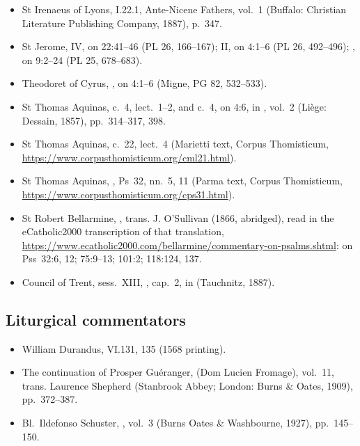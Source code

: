 {\begin{itemize}
\item St Irenaeus of Lyons,  I.22.1, Ante-Nicene Fathers, vol.~1 (Buffalo: Christian Literature Publishing Company, 1887), p.~347.
\item St Jerome,  IV, on 22:41--46 (PL 26, 166--167);  II, on 4:1--6 (PL 26, 492--496); , on 9:2--24 (PL 25, 678--683).
\item Theodoret of Cyrus, , on 4:1--6 (Migne, PG 82, 532--533).
\item St Thomas Aquinas,  c.~4, lect.~1--2, and  c.~4, on 4:6, in , vol.~2 (Liège: Dessain, 1857), pp.~314--317, 398.
\item St Thomas Aquinas,  c.~22, lect.~4 (Marietti text, Corpus Thomisticum, \url{https://www.corpusthomisticum.org/cml21.html}).
\item St Thomas Aquinas, , Ps~32, nn.~5, 11 (Parma text, Corpus Thomisticum, \url{https://www.corpusthomisticum.org/cps31.html}).
\item St Robert Bellarmine, , trans. J. O'Sullivan (1866, abridged), read in the eCatholic2000 transcription of that translation, \url{https://www.ecatholic2000.com/bellarmine/commentary-on-psalms.shtml}: on Pss~32:6, 12; 75:9--13; 101:2; 118:124, 137.
\item Council of Trent, sess.~XIII, , cap.~2, in  (Tauchnitz, 1887).
\end{itemize}

\subsection*{Liturgical commentators}
\begin{itemize}
\item William Durandus,  VI.131, 135 (1568 printing).
\item The continuation of Prosper Guéranger,  (Dom Lucien Fromage), vol.~11, trans. Laurence Shepherd (Stanbrook Abbey; London: Burns \& Oates, 1909), pp.~372--387.
\item Bl.\ Ildefonso Schuster, , vol.~3 (Burns Oates \& Washbourne, 1927), pp.~145--150.
\end{itemize}

}
